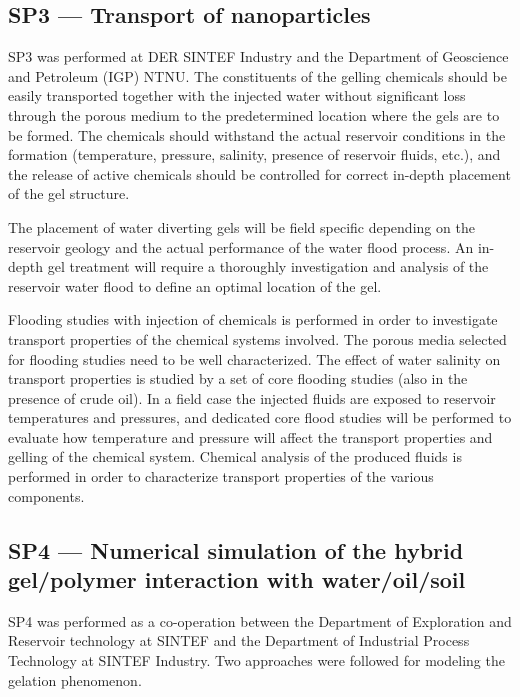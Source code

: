\subsection*{SP3 --- Transport of nanoparticles}
%
SP3 was performed at DER SINTEF Industry and the Department of Geoscience and Petroleum (IGP) NTNU.  
The constituents of the gelling chemicals should be easily transported together with the injected water without significant loss through the porous medium to the predetermined location where the gels are to be formed. The chemicals should withstand the actual reservoir conditions in the formation (temperature, pressure, salinity, presence of reservoir fluids, etc.), and the release of active chemicals should be controlled for correct in-depth placement of the gel structure. 

The placement of water diverting gels will be field specific depending on the reservoir geology and the actual performance of the water flood process. An in-depth gel treatment will require a thoroughly investigation and analysis of the reservoir water flood to define an optimal location of the gel. 

Flooding studies with injection of chemicals is performed in order to investigate transport properties of the chemical systems involved. The porous media selected for flooding studies need to be well characterized. The effect of water salinity on transport properties is studied by a set of core flooding studies (also in the presence of crude oil). In a field case the injected fluids are exposed to reservoir temperatures and pressures, and dedicated core flood studies will be performed to evaluate how temperature and pressure will affect the transport properties and gelling of the chemical system. Chemical analysis of the produced fluids is performed in order to characterize transport properties of the various components.

\subsection*{SP4 --- Numerical simulation of the hybrid gel/polymer interaction with water/oil/soil}
%

SP4 was performed as a co-operation between the Department of Exploration and Reservoir technology at SINTEF and the Department of Industrial Process Technology at SINTEF Industry. Two approaches were followed for modeling the gelation phenomenon. 

